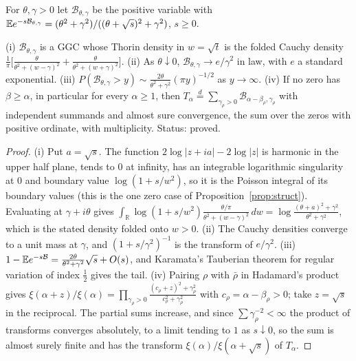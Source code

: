 For $\theta,\gamma>0$ let $\mathcal B_{\theta,\gamma}$ be the positive variable with $\mathbb{E} e^{-s\mathcal B_{\theta,\gamma}}=(\theta^2+\gamma^2)/((\theta+\sqrt s)^2+\gamma^2)$, $s\ge0$.

\begin{proposition}\label{fm:prop:block}
\textup{(i)} $\mathcal B_{\theta,\gamma}$ is a GGC whose Thorin density in $w=\sqrt t$ is the folded Cauchy density $\frac1\pi\bigl[\frac\theta{\theta^2+(w-\gamma)^2}+\frac\theta{\theta^2+(w+\gamma)^2}\bigr]$. \textup{(ii)} As $\theta\downarrow0$, $\mathcal B_{\theta,\gamma}\to e/\gamma^2$ in law, with $e$ a standard exponential. \textup{(iii)} $P(\mathcal B_{\theta,\gamma}>y)\sim\frac{2\theta}{\theta^2+\gamma^2}(\pi y)^{-1/2}$ as $y\to\infty$. \textup{(iv)} If no zero has $\beta\ge\alpha$, in particular for every $\alpha\ge1$, then $T_\alpha\overset d=\sum_{\gamma_\rho>0}\mathcal B_{\alpha-\beta_\rho,\gamma_\rho}$ with independent summands and almost sure convergence, the sum over the zeros with positive ordinate, with multiplicity. Status: proved.
\end{proposition}

\begin{proof}
(i) Put $a=\sqrt s$. The function $2\log|z+ia|-2\log|z|$ is harmonic in the upper half plane, tends to $0$ at infinity, has an integrable logarithmic singularity at $0$ and boundary value $\log(1+s/w^2)$, so it is the Poisson integral of its boundary values (this is the one zero case of Proposition~\ref{prop:struct}). Evaluating at $\gamma+i\theta$ gives $\int_{\mathbb R}\log(1+s/w^2)\frac{\theta/\pi}{\theta^2+(w-\gamma)^2}\,dw=\log\frac{(\theta+a)^2+\gamma^2}{\theta^2+\gamma^2}$, which is the stated density folded onto $w>0$. (ii) The Cauchy densities converge to a unit mass at $\gamma$, and $(1+s/\gamma^2)^{-1}$ is the transform of $e/\gamma^2$. (iii) $1-\mathbb{E} e^{-s\mathcal B}=\frac{2\theta}{\theta^2+\gamma^2}\sqrt s+O(s)$, and Karamata's Tauberian theorem for regular variation of index $\frac12$ gives the tail. (iv) Pairing $\rho$ with $\bar\rho$ in Hadamard's product gives $\xi(\alpha+z)/\xi(\alpha)=\prod_{\gamma_\rho>0}\frac{(c_\rho+z)^2+\gamma_\rho^2}{c_\rho^2+\gamma_\rho^2}$ with $c_\rho=\alpha-\beta_\rho>0$; take $z=\sqrt s$ in the reciprocal. The partial sums increase, and since $\sum\gamma_\rho^{-2}<\infty$ the product of transforms converges absolutely, to a limit tending to $1$ as $s\downarrow0$, so the sum is almost surely finite and has the transform $\xi(\alpha)/\xi(\alpha+\sqrt s)$ of $T_\alpha$.
\end{proof}

